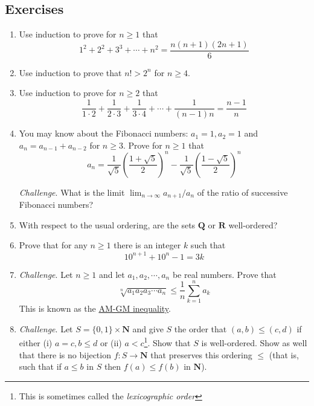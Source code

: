 \documentclass[12pt]{article}
\numberwithin{equation}{subsection}
\theoremstyle{note}
\begin{document}
\subsection{Exercises} 
\begin{enumerate}[label=\arabic*.]
	\item Use induction to prove for $n\geq 1$ that \[ 1^2+2^2+3^3+\cdots+n^2=\dfrac{n(n+1)(2n+1)}{6}\] 
	\item Use induction to prove that $n!>2^n$ for $n\geq 4$. 
	\item Use induction to prove for $n\geq 2$ that \[ \dfrac{1}{1\cdot 2} + \dfrac{1}{2\cdot 3} + \dfrac{1}{3\cdot 4} +\cdots + \dfrac{1}{(n-1)n} = \dfrac{n-1}{n}\]
	\item You may know about the Fibonacci numbers: $a_1=1, a_2=1$ and $a_{n}=a_{n-1}+a_{n-2}$ for $n\geq 3$. Prove for $n\geq 1$ that \[ a_n=\dfrac{1}{\sqrt{5}}  \left( \dfrac{1+\sqrt{5}}{2} \right)^n- \dfrac{1}{\sqrt{5}}\left(\dfrac{1-\sqrt{5}}{2}\right)^n\]  
	
	\textit{Challenge}. What is the limit $\lim_{n\to \infty} a_{n+1}/a_n$ of the ratio of successive Fibonacci numbers?
	\item With respect to the usual ordering, are the sets $\mathbf{Q}$ or $\mathbf{R}$ well-ordered?
	
	\item Prove that for any $n\geq 1$ there is an integer $k$ such that \[ 10^{n+1}+10^{n}-1=3k\] 
	
	\item \textit{Challenge}. Let $n\geq 1$ and let $a_1,a_2,\cdots, a_n$ be real numbers. Prove that \[ \sqrt[n]{a_1a_2a_3\cdots a_n}\leq \dfrac{1}{n} \sum_{k=1}^n a_k\] This is known as the \href{https://en.wikipedia.org/wiki/AM\%E2\%80\%93GM_inequality}{AM-GM inequality}.
	\item \textit{Challenge}. Let $S=\{0,1\}\times \mathbf{N}$ and give $S$ the order that $(a,b)\leq (c,d)$ if either (i)  $a=c, b\leq d$ or (ii)  $a<c$\footnote{This is sometimes called the \textit{lexicographic order}}. Show that $S$ is well-ordered. Show as well that there is no bijection $f\colon S\to \mathbf{N}$ that preserves this ordering $\leq$ (that is, such that if $a\leq b$ in $S$ then $f(a)\leq f(b)$ in $\mathbf{N}$).
\end{enumerate}
\end{document}
